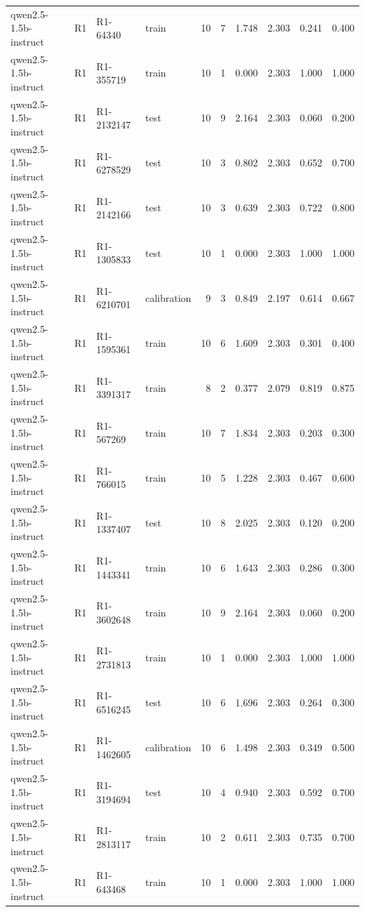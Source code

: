 \begin{table}
\begin{tabular}{llllrrrrrr}
qwen2.5-1.5b-instruct & R1 & R1-64340 & train & 10 & 7 & 1.748 & 2.303 & 0.241 & 0.400 \\
qwen2.5-1.5b-instruct & R1 & R1-355719 & train & 10 & 1 & 0.000 & 2.303 & 1.000 & 1.000 \\
qwen2.5-1.5b-instruct & R1 & R1-2132147 & test & 10 & 9 & 2.164 & 2.303 & 0.060 & 0.200 \\
qwen2.5-1.5b-instruct & R1 & R1-6278529 & test & 10 & 3 & 0.802 & 2.303 & 0.652 & 0.700 \\
qwen2.5-1.5b-instruct & R1 & R1-2142166 & test & 10 & 3 & 0.639 & 2.303 & 0.722 & 0.800 \\
qwen2.5-1.5b-instruct & R1 & R1-1305833 & test & 10 & 1 & 0.000 & 2.303 & 1.000 & 1.000 \\
qwen2.5-1.5b-instruct & R1 & R1-6210701 & calibration & 9 & 3 & 0.849 & 2.197 & 0.614 & 0.667 \\
qwen2.5-1.5b-instruct & R1 & R1-1595361 & train & 10 & 6 & 1.609 & 2.303 & 0.301 & 0.400 \\
qwen2.5-1.5b-instruct & R1 & R1-3391317 & train & 8 & 2 & 0.377 & 2.079 & 0.819 & 0.875 \\
qwen2.5-1.5b-instruct & R1 & R1-567269 & train & 10 & 7 & 1.834 & 2.303 & 0.203 & 0.300 \\
qwen2.5-1.5b-instruct & R1 & R1-766015 & train & 10 & 5 & 1.228 & 2.303 & 0.467 & 0.600 \\
qwen2.5-1.5b-instruct & R1 & R1-1337407 & test & 10 & 8 & 2.025 & 2.303 & 0.120 & 0.200 \\
qwen2.5-1.5b-instruct & R1 & R1-1443341 & train & 10 & 6 & 1.643 & 2.303 & 0.286 & 0.300 \\
qwen2.5-1.5b-instruct & R1 & R1-3602648 & train & 10 & 9 & 2.164 & 2.303 & 0.060 & 0.200 \\
qwen2.5-1.5b-instruct & R1 & R1-2731813 & train & 10 & 1 & 0.000 & 2.303 & 1.000 & 1.000 \\
qwen2.5-1.5b-instruct & R1 & R1-6516245 & test & 10 & 6 & 1.696 & 2.303 & 0.264 & 0.300 \\
qwen2.5-1.5b-instruct & R1 & R1-1462605 & calibration & 10 & 6 & 1.498 & 2.303 & 0.349 & 0.500 \\
qwen2.5-1.5b-instruct & R1 & R1-3194694 & test & 10 & 4 & 0.940 & 2.303 & 0.592 & 0.700 \\
qwen2.5-1.5b-instruct & R1 & R1-2813117 & train & 10 & 2 & 0.611 & 2.303 & 0.735 & 0.700 \\
qwen2.5-1.5b-instruct & R1 & R1-643468 & train & 10 & 1 & 0.000 & 2.303 & 1.000 & 1.000 \\

\end{tabular}
\end{table}
